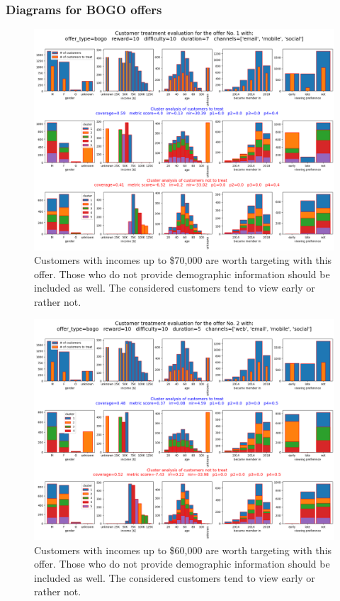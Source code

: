 \documentclass[11pt]{article} %
\begin{document}
\subsubsection{Diagrams for BOGO offers}

\begin{figure}[H]
\includegraphics[height=0.5\textheight]{results/results1.png}
\caption{Customers with  incomes up to \$70,000 are worth targeting with this offer.  Those who do not provide demographic information should be included as well. The considered customers tend to view early or rather not. }
\end{figure}
\begin{figure}[H]
\includegraphics[height=0.5\textheight]{results/results2.png}
\caption{Customers with  incomes up to \$60,000 are worth targeting with this offer.  Those who do not provide demographic information should be included as well. The considered customers tend to view early or rather not. }
\end{figure}
\end{document}

